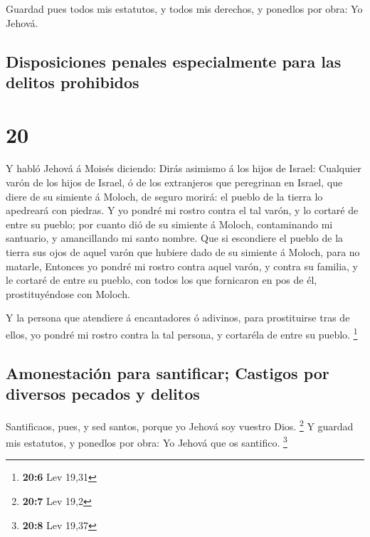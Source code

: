  Guardad pues todos mis estatutos, y todos mis derechos,
y ponedlos por obra: Yo Jehová.

\hypertarget{disposiciones-penales-especialmente-para-las-delitos-prohibidos}{%
\subsection{Disposiciones penales especialmente para las delitos
prohibidos}\label{disposiciones-penales-especialmente-para-las-delitos-prohibidos}}

\hypertarget{section-19}{%
\section{20}\label{section-19}}

 Y habló Jehová á Moisés diciendo:  Dirás
asimismo á los hijos de Israel: Cualquier varón de los hijos de Israel,
ó de los extranjeros que peregrinan en Israel, que diere de su simiente
á Moloch, de seguro morirá: el pueblo de la tierra lo apedreará con
piedras.  Y yo pondré mi rostro contra el tal varón, y lo
cortaré de entre su pueblo; por cuanto dió de su simiente á Moloch,
contaminando mi santuario, y amancillando mi santo nombre.
 Que si escondiere el pueblo de la tierra sus ojos de
aquel varón que hubiere dado de su simiente á Moloch, para no matarle,
 Entonces yo pondré mi rostro contra aquel varón, y contra
su familia, y le cortaré de entre su pueblo, con todos los que
fornicaron en pos de él, prostituyéndose con Moloch.

 Y la persona que atendiere á encantadores ó adivinos,
para prostituirse tras de ellos, yo pondré mi rostro contra la tal
persona, y cortaréla de entre su pueblo. \footnote{\textbf{20:6} Lev
  19,31}

\hypertarget{amonestaciuxf3n-para-santificar-castigos-por-diversos-pecados-y-delitos}{%
\subsection{Amonestación para santificar; Castigos por diversos pecados
y
delitos}\label{amonestaciuxf3n-para-santificar-castigos-por-diversos-pecados-y-delitos}}

 Santificaos, pues, y sed santos, porque yo Jehová soy
vuestro Dios. \footnote{\textbf{20:7} Lev 19,2}  Y guardad
mis estatutos, y ponedlos por obra: Yo Jehová que os santifico.
\footnote{\textbf{20:8} Lev 19,37}

